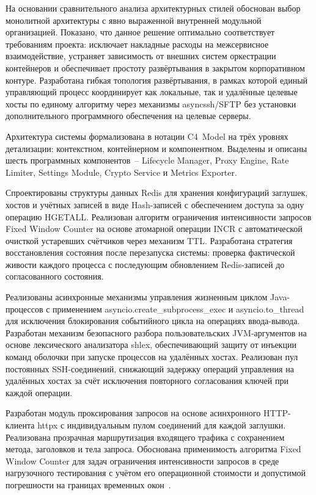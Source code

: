 На основании сравнительного анализа архитектурных стилей обоснован выбор монолитной архитектуры с явно выраженной внутренней модульной организацией. Показано, что данное решение оптимально соответствует требованиям проекта: исключает накладные расходы на межсервисное взаимодействие, устраняет зависимость от внешних систем оркестрации контейнеров и обеспечивает простоту развёртывания в закрытом корпоративном контуре. Разработана гибкая топология развёртывания, в рамках которой единый управляющий процесс координирует как локальные, так и удалённые целевые хосты по единому алгоритму через механизмы asyncssh/SFTP без установки дополнительного программного обеспечения на целевые серверы.

Архитектура системы формализована в нотации C4~Model на трёх уровнях детализации: контекстном, контейнерном и компонентном. Выделены и описаны шесть программных компонентов~-- Lifecycle Manager, Proxy Engine, Rate Limiter, Settings Module, Crypto Service и Metrics Exporter.

Спроектированы структуры данных Redis для хранения конфигураций заглушек, хостов и учётных записей в виде Hash-записей с обеспечением доступа за одну операцию HGETALL. Реализован алгоритм ограничения интенсивности запросов Fixed Window Counter на основе атомарной операции INCR с автоматической очисткой устаревших счётчиков через механизм TTL. Разработана стратегия восстановления состояния после перезапуска системы: проверка фактической живости каждого процесса с последующим обновлением Redis-записей до согласованного состояния.

Реализованы асинхронные механизмы управления жизненным циклом Java-процессов с применением asyncio.create\_subprocess\_exec и asyncio.to\_thread для исключения блокирования событийного цикла на операциях ввода-вывода. Разработан механизм безопасного разбора пользовательских JVM-аргументов на основе лексического анализатора shlex, обеспечивающий защиту от инъекции команд оболочки при запуске процессов на удалённых хостах. Реализован пул постоянных SSH-соединений, снижающий задержку операций управления на удалённых хостах за счёт исключения повторного согласования ключей при каждой операции.

Разработан модуль проксирования запросов на основе асинхронного HTTP-клиента httpx с индивидуальным пулом соединений для каждой заглушки. Реализована прозрачная маршрутизация входящего трафика с сохранением метода, заголовков и тела запроса. Обоснована применимость алгоритма Fixed Window Counter для задач ограничения интенсивности запросов в среде нагрузочного тестирования с учётом его операционной стоимости и допустимой погрешности на границах временных окон~\cite{tanenbaum-networks}.

